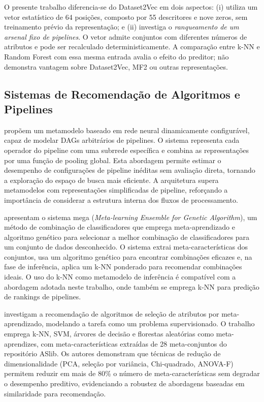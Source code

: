 O presente trabalho diferencia-se do Dataset2Vec em dois aspectos: (i) utiliza um vetor estatístico de 64 posições, composto por 55 descritores e nove zeros, sem treinamento prévio da representação; e (ii) investiga o \textit{ranqueamento de um arsenal fixo de pipelines}. O vetor admite conjuntos com diferentes números de atributos e pode ser recalculado deterministicamente. A comparação entre k-NN e Random Forest com essa mesma entrada avalia o efeito do preditor; não demonstra vantagem sobre Dataset2Vec, MF2 ou outras representações.

\subsection{Sistemas de Recomendação de Algoritmos e Pipelines}
\label{sec:relRecomendacao}

 propõem um metamodelo baseado em rede neural dinamicamente configurável, capaz de modelar DAGs arbitrários de pipelines. O sistema representa cada operador do pipeline com uma subrrede específica e combina as representações por uma função de pooling global. Esta abordagem permite estimar o desempenho de configurações de pipeline inéditas sem avaliação direta, tornando a exploração do espaço de busca mais eficiente. A arquitetura supera metamodelos com representações simplificadas de pipeline, reforçando a importância de considerar a estrutura interna dos fluxos de processamento.

 apresentam o sistema \gls{mega} (\textit{Meta-learning Ensemble for Genetic Algorithm}), um método de combinação de classificadores que emprega meta-aprendizado e algoritmo genético para selecionar a melhor combinação de classificadores para um conjunto de dados desconhecido. O sistema extrai meta-características dos conjuntos, usa um algoritmo genético para encontrar combinações eficazes e, na fase de inferência, aplica um k-NN ponderado para recomendar combinações ideais. O uso do k-NN como metamodelo de inferência é compatível com a abordagem adotada neste trabalho, onde também se emprega k-NN para predição de rankings de pipelines.

 investigam a recomendação de algoritmos de seleção de atributos por meta-aprendizado, modelando a tarefa como um problema supervisionado. O trabalho emprega k-NN, SVM, árvores de decisão e florestas aleatórias como meta-aprendizes, com meta-características extraídas de 28 meta-conjuntos do repositório ASlib. Os autores demonstram que técnicas de redução de dimensionalidade (PCA, seleção por variância, Chi-quadrado, ANOVA-F) permitem reduzir em mais de 80\% o número de meta-características sem degradar o desempenho preditivo, evidenciando a robustez de abordagens baseadas em similaridade para recomendação.

